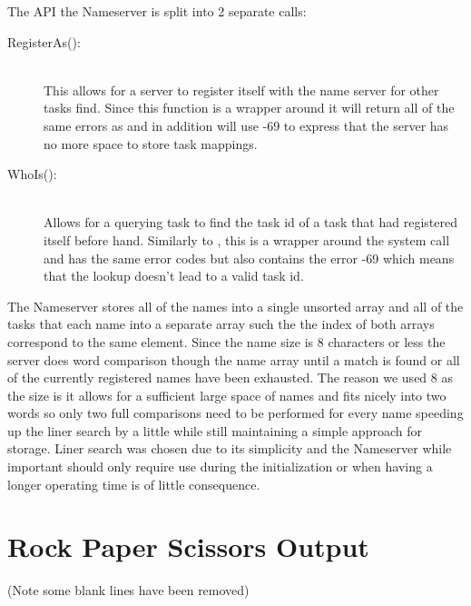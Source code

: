 \documentclass[pdftex,10pt,a4paper]{article}
\begin{document}
The API the Nameserver is split into 2 separate calls:
\begin{description}
\item[RegisterAs():] \hfill \\
This allows for a server to register itself with the name server for
other tasks find. Since this function is a wrapper around 
it will return all of the same errors as  and in addition
will use -69 to express that the server has no more space to store
task mappings.

\item[WhoIs():] \hfill \\
Allows for a querying task to find the task id of a task that had
registered itself before hand. Similarly to , this
is a wrapper around the  system call and has the same
error codes but also contains the error -69 which means that the
lookup doesn’t lead to a valid task id.
\end{description}

The Nameserver stores all of the names into a single unsorted array
and all of the tasks that each name into a separate array such the the
index of both arrays correspond to the same element. Since the name
size is 8 characters or less the server does word comparison though
the name array until a match is found or all of the currently
registered names have been exhausted. The reason we used 8 as the size
is it allows for a sufficient large space of names and fits nicely
into two words so only two full comparisons need to be performed for
every name speeding up the liner search by a little while still
maintaining a simple approach for storage. Liner search was chosen due
to its simplicity and the Nameserver while important should only
require use during the initialization or when having a longer
operating time is of little consequence.


\section*{Rock Paper Scissors Output}



(Note some blank lines have been removed)
\end{document}
